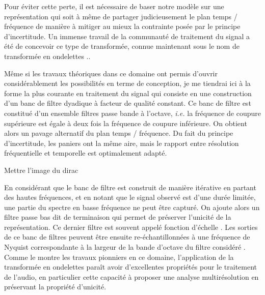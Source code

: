 Pour éviter cette perte, il est nécessaire de baser notre modèle sur une représentation qui soit à même de partager judicieusement le plan temps / fréquence de manière à mitiger au mieux la contrainte posée par le principe d'incertitude. Un immense travail de la communauté de traitement du signal a été de concevoir ce type de transformée, connue maintenant sous le nom de transformée en \og ondelettes \fg.\cite{mallat1989theory}.

Même si les travaux théoriques dans ce domaine ont permis d'ouvrir considérablement les possibilités en terme de conception, je me  tiendrai ici à la forme la plus courante en traitement du signal qui consiste en une construction d'un banc de filtre dyadique à facteur de qualité constant. Ce banc de filtre est constitué d'un ensemble filtres passe bande à l'octave, \textit{i.e.} la fréquence de coupure supérieure est égale à deux fois la fréquence de coupure inférieure. On obtient alors un pavage alternatif du plan temps / fréquence. Du fait du principe d'incertitude, les paniers ont la même aire, mais le rapport entre résolution fréquentielle et temporelle est optimalement adapté.


Mettre l'image du dirac

En considérant que le banc de filtre est construit de manière itérative en partant des hautes fréquences, et en notant que le signal observé est d'une durée limitée, une partie du spectre en basse fréquence ne peut être capturé. On ajoute alors un filtre passe bas dit \og de terminaison \fg qui permet de préserver l'unicité de la représentation. Ce dernier filtre est souvent appelé \og fonction d'échelle \fg. Les sorties de ce banc de filtres peuvent être ensuite re-échantillonnées à une fréquence de Nyquist correspondante à la largeur de la bande d'octave du filtre considéré%
. Comme le montre les travaux pionniers en ce domaine\cite{kronland1987analysis}, l'application de la transformée en ondelettes paraît avoir d'excellentes propriétés pour le traitement de l'audio, en particulier cette capacité à proposer une analyse multirésolution en préservant la propriété d'unicité.


